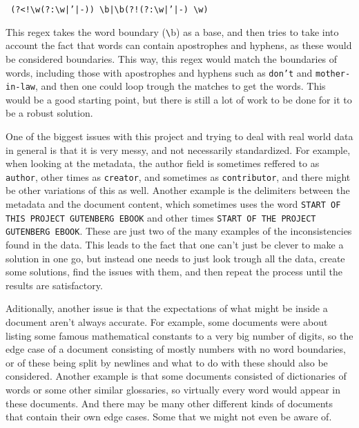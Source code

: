 \documentclass{article}
\begin{document}
\begin{center}
\texttt{
(?<!{\textbackslash}w(?:{\textbackslash}w|'|-))%
{\textbackslash}b|{\textbackslash}b(?!(?:{\textbackslash}w|'|-)%
{\textbackslash}w)
}
\end{center}

This regex takes the word boundary (\texttt{\textbackslash}b) as a base, and then
tries to take into account the fact that words can contain apostrophes and hyphens,
as these would be considered boundaries.
This way, this regex would match the boundaries of words, including those
with apostrophes and hyphens such as \texttt{don't} and \texttt{mother-in-law},
and then one could loop trough the matches to get the words.
This would be a good starting point, but there is still a lot of work to be done
for it to be a robust solution.

One of the biggest issues with this project and trying to deal
with real world data in general is that it is very messy, and not
necessarily standardized.
For example, when looking at the metadata, the
author field is sometimes reffered to as \texttt{author}, other times as \texttt{creator},
and sometimes as \texttt{contributor}, and there might
be other variations of this as well.
Another example is the delimiters between the metadata
and the document content, which sometimes uses the word \texttt{START OF THIS PROJECT GUTENBERG EBOOK}
and other times \texttt{START OF THE PROJECT GUTENBERG EBOOK}.
These are just two of the many examples of the inconsistencies found in the data.
This leads to the fact that one can't just be clever to
make a solution in one go, but instead
one needs to just look trough all
the data, create some solutions, find
the issues with them, and then repeat the process
until the results are satisfactory.

Aditionally, another issue is that the expectations
of what might be inside a document aren't always accurate.
For example, some documents were about listing some
famous mathematical constants to a very big number of digits,
so the edge case of a document consisting of mostly
numbers with no word boundaries, or of these
being split by newlines and what to do with these
should also be considered.
Another example is that some documents consisted
of dictionaries of words or some other similar
glossaries, so virtually every word would appear in these documents.
And there may be many other different kinds of documents
that contain their own edge cases. Some that we might
not even be aware of.
\end{document}
